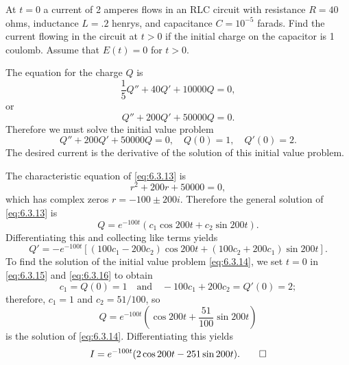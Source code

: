 \begin{example}\label{example:6.3.1}
At $t=0$ a current of 2 amperes flows in an RLC circuit with
resistance $R=40$ ohms, inductance $L=.2$ henrys, and capacitance
$C=10^{-5}$ farads. Find the current flowing in the circuit at $t>0$
if the initial charge on the capacitor is 1 coulomb. Assume that
$E(t)=0$ for $t>0$.
\end{example}

\begin{solution}
The equation for the charge $Q$ is \[
\frac{1}{5}Q''+40Q'+10000Q=0, \] or
\begin{equation} \label{eq:6.3.13}
Q''+200Q'+50000Q=0.
\end{equation}
Therefore we must solve the initial value problem
\begin{equation} \label{eq:6.3.14}
Q''+200Q'+50000Q=0,\quad Q(0)=1,\quad Q'(0)=2.
\end{equation}
The desired current is the derivative of the solution of this initial
value problem.

The characteristic equation of \eqref{eq:6.3.13} is
\[
r^2+200r+50000=0,
\]
which has complex zeros $r=-100\pm200i$. Therefore the general
solution of \eqref{eq:6.3.13} is
\begin{equation} \label{eq:6.3.15}
Q=e^{-100t}(c_1\cos200t+c_2\sin200t).
\end{equation}
Differentiating this and collecting like terms yields
\begin{equation} \label{eq:6.3.16}
Q'=-e^{-100t}\left[(100c_1-200c_2)\cos200t+
(100c_2+200c_1)\sin200t\right].
\end{equation}
To find the solution of the initial value problem \eqref{eq:6.3.14},
we set $t=0$ in \eqref{eq:6.3.15} and \eqref{eq:6.3.16} to obtain
\[
c_1=Q(0)=1\quad\text{and}\quad    -100c_1+200c_2=Q'(0)=2;
\]
therefore, $c_1=1$ and $c_2=51/100$, so
\[
Q=e^{-100t}\left(\cos200t+\frac{51}{100}\sin200t\right)
\]
is the solution of \eqref{eq:6.3.14}.
Differentiating this yields
\[
I=e^{-100t}(2\cos200t-251\sin200t).\qedhere
\]
\end{solution}



